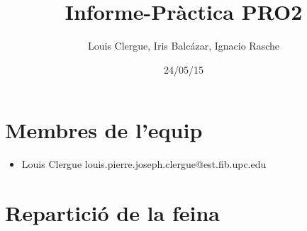 \documentclass[a4paper,10pt]{article}
\title{Informe-Pràctica PRO2}
\author{Louis Clergue, Iris Balcázar, Ignacio Rasche}
\date{24/05/15}
\begin{document}
\maketitle
\section{Membres de l'equip}
\begin{itemize}
  \item Louis Clergue louis.pierre.joseph.clergue@est.fib.upc.edu
\end{itemize}
\section{Repartició de la feina}
\end{document}
